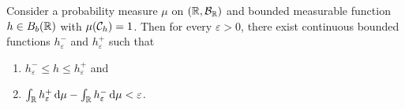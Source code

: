 \begin{lemma}
Consider a probability measure $\mu$ on $(\mathbb R, \mathcal B_{\mathbb R})$ and bounded measurable function $h\in B_b(\mathbb R)$ with $\mu(\mathcal C_h) = 1$. Then for every $\varepsilon > 0$, there exist continuous bounded functions $h^-_\varepsilon$ and $h^+_\varepsilon$ such that
\begin{enumerate}[label={(\arabic*)}]
\item $h^-_\varepsilon \le h \le h^+_\varepsilon$ and
\item $\int_{\mathbb R} h^+_\varepsilon \, \mathrm{d} \mu - \int_{\mathbb R} h^-_\varepsilon \, \mathrm{d} \mu < \varepsilon$.
\end{enumerate} 
\end{lemma}
%
%
